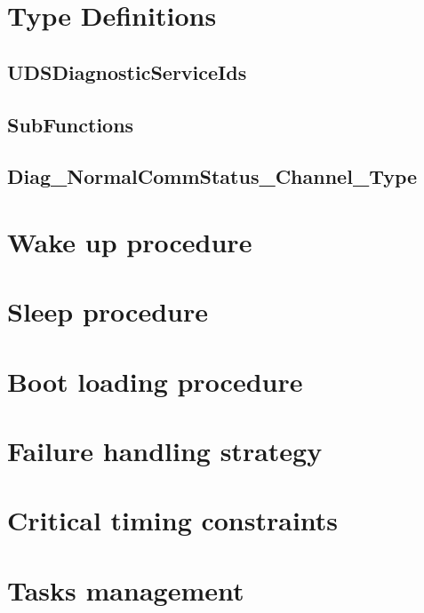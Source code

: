 \section{Type Definitions}

\subsection{UDSDiagnosticServiceIds}

{

}
{}

\subsection{SubFunctions}

{

}
{}

\subsection{Diag_NormalCommStatus_Channel_Type}

{

}
{}

\section{Wake up procedure}

\section{Sleep procedure}

\section{Boot loading procedure}

\section{Failure handling strategy}

\section{Critical timing constraints}

\section{Tasks management}
\label{sec:Tasks_management}

